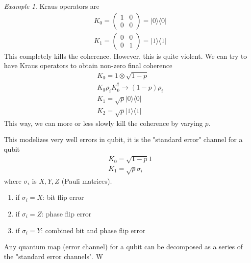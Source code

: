 \documentclass[a4paper]{book}
\theoremstyle{definition}
\theoremstyle{remark}
\newtheorem*{example}{Example}
\begin{document}
\begin{example}
    Kraus operators are 
    \begin{equation}
        \begin{aligned}
            &K_0 = \begin{pmatrix}
                1 & 0 \\ 0 & 0
            \end{pmatrix} = |0\rangle \langle 0|\\
            &K_1 = \begin{pmatrix}
                0 & 0 \\ 0 & 1
            \end{pmatrix} = |1\rangle \langle 1|
        \end{aligned}
    \end{equation}
    This completely kills the coherence. However, this is quite violent. We can try to have Kraus operators to obtain non-zero final coherence 
    \begin{equation}
        \begin{aligned}
            &K_0 = 1 \otimes \sqrt{1-p} \\
            &K_0\rho_i K^\dagger_0 \rightarrow (1-p)\rho_i \\
            &K_1 = \sqrt{p}|0\rangle \langle 0| \\
            &K_2 = \sqrt{p}|1\rangle \langle 1|
        \end{aligned}
    \end{equation}
    This way, we can more or less slowly kill the coherence by varying $p$.
\end{example}

This modelizes very well errors in qubit, it is the "standard error" channel for a qubit 
\begin{equation}
    \begin{aligned}
        &K_0 = \sqrt{1-p} 1 \\
        &K_1 = \sqrt{p} \sigma_i
    \end{aligned}
\end{equation}
where $\sigma_i$ is $X, Y, Z$ (Pauli matrices). 
\begin{enumerate}
    \item if $\sigma_i = X$: bit flip error 
    \item if $\sigma_i = Z$: phase flip error 
    \item if $\sigma_i = Y$: combined bit and phase flip error 
\end{enumerate}

Any quantum map (error channel) for a qubit can be decomposed as a series of the "standard error channels". W
\end{document}
